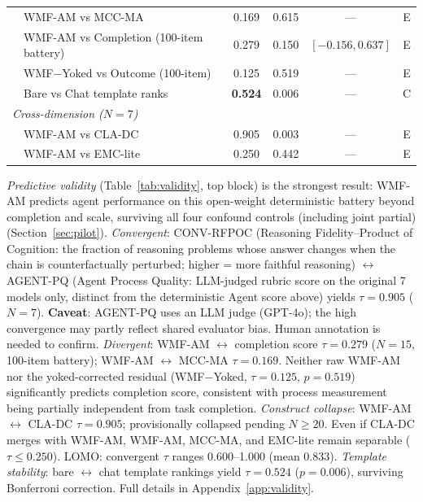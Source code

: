 \documentclass{article}
\begin{document}
\begin{table}[t]
{\begin{tabular}{llcccc}
& WMF-AM vs MCC-MA & 0.169 & 0.615 & --- & E \\
& WMF-AM vs Completion (100-item battery) & 0.279 & 0.150 & $[-0.156, 0.637]$ & E \\
& WMF$-$Yoked vs Outcome (100-item) & 0.125 & 0.519 & --- & E \\
& Bare vs Chat template ranks & \textbf{0.524} & 0.006 & --- & C \\
\midrule
\multicolumn{6}{l}{\emph{Cross-dimension ($N{=}7$)}} \\
& WMF-AM vs CLA-DC & 0.905 & 0.003 & --- & E \\
& WMF-AM vs EMC-lite & 0.250 & 0.442 & --- & E \\
\bottomrule
\end{tabular}}
\end{table}

\emph{Predictive validity} (Table~\ref{tab:validity}, top block)
is the strongest result: WMF-AM predicts agent performance on this
open-weight deterministic battery beyond completion and scale,
surviving all four confound controls (including joint partial)
(Section~\ref{sec:pilot}).
\emph{Convergent}: CONV-RFPOC (Reasoning Fidelity--Product of Cognition:
the fraction of reasoning problems whose answer changes when the
chain is counterfactually perturbed; higher = more faithful reasoning)
$\leftrightarrow$ AGENT-PQ (Agent Process Quality: LLM-judged rubric
score on the original 7 models only, distinct from the deterministic
Agent score above)
yields $\tau = 0.905$ ($N{=}7$). \textbf{Caveat}: AGENT-PQ uses
an LLM judge (GPT-4o); the high convergence may partly reflect shared
evaluator bias. Human annotation is needed to confirm.
\emph{Divergent}: WMF-AM $\leftrightarrow$ completion score $\tau = 0.279$
($N{=}15$, 100-item battery); WMF-AM $\leftrightarrow$ MCC-MA
$\tau = 0.169$. Neither raw WMF-AM nor the yoked-corrected residual
(WMF$-$Yoked, $\tau = 0.125$, $p = 0.519$) significantly predicts
completion score, consistent with process measurement being partially
independent from task completion.
\emph{Construct collapse}: WMF-AM $\leftrightarrow$ CLA-DC
$\tau = 0.905$; provisionally collapsed pending $N \geq 20$.
Even if CLA-DC merges with WMF-AM, WMF-AM, MCC-MA, and EMC-lite
remain separable ($\tau \leq 0.250$).
LOMO: convergent $\tau$ ranges 0.600--1.000 (mean 0.833).
\emph{Template stability}: bare $\leftrightarrow$ chat template
rankings yield $\tau = 0.524$ ($p = 0.006$), surviving Bonferroni
correction.
Full details in Appendix~\ref{app:validity}.

\end{document}

